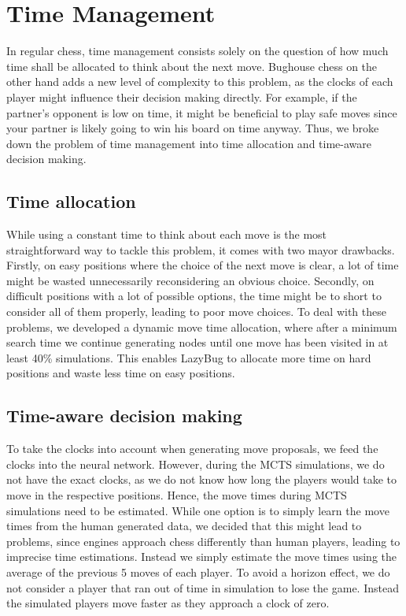 \section{Time Management}
In regular chess, time management consists solely on the question of how much time shall be allocated to think about the next move.
Bughouse chess on the other hand adds a new level of complexity to this problem, as the clocks of each player might influence their decision making directly.
For example, if the partner's opponent is low on time, it might be beneficial to play safe moves since your partner is likely going to win his board on time anyway.
Thus, we broke down the problem of time management into time allocation and time-aware decision making.

\subsection{Time allocation}
While using a constant time to think about each move is the most straightforward way to tackle this problem, it comes with two mayor drawbacks.
Firstly, on easy positions where the choice of the next move is clear, a lot of time might be wasted unnecessarily reconsidering an obvious choice.
Secondly, on difficult positions with a lot of possible options, the time might be to short to consider all of them properly, leading to poor move choices.
To deal with these problems, we developed a dynamic move time allocation, where after a minimum search time we continue generating nodes until one move has been visited in at least 40\% simulations.
This enables LazyBug to allocate more time on hard positions and waste less time on easy positions.

\subsection{Time-aware decision making}
To take the clocks into account when generating move proposals, we feed the clocks into the neural network.
However, during the MCTS simulations, we do not have the exact clocks, as we do not know how long the players would take to move in the respective positions.
Hence, the move times during MCTS simulations need to be estimated.
While one option is to simply learn the move times from the human generated data, we decided that this might lead to problems, since engines approach chess differently than human players, leading to imprecise time estimations.
Instead we simply estimate the move times using the average of the previous 5 moves of each player.
To avoid a horizon effect, we do not consider a player that ran out of time in simulation to lose the game.
Instead the simulated players move faster as they approach a clock of zero.
